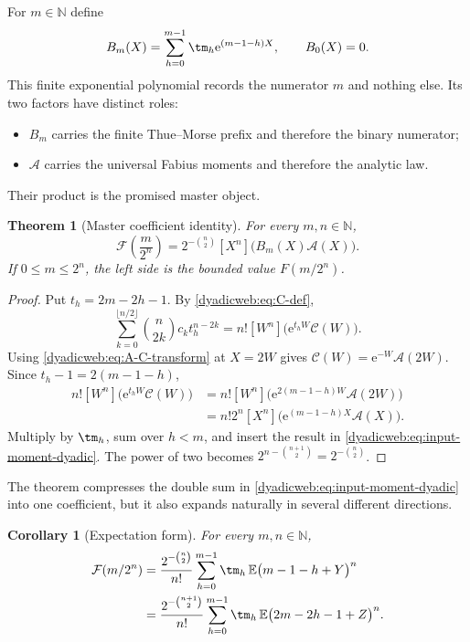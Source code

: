 \documentclass[11pt,oneside]{article}
\newtheorem{theorem}{Theorem}[section]
\newtheorem{corollary}[corollary]{Corollary}
\theoremstyle{definition}
\theoremstyle{remark}
\newcommand{\N}{\mathbb N}
\newcommand{\e}{\mathrm e}
\newcommand{\E}{\mathbb E}
\begin{document}
For $m\in\N$ define
\begin{equation}
 B_m(X)=\sum_{h=0}^{m-1}\tm_h\e^{(m-1-h)X},
 \qquad B_0(X)=0.                                         \label{dyadicweb:eq:Bm-def}
\end{equation}
This finite exponential polynomial records the numerator $m$ and nothing else.  Its two
factors have distinct roles:
\begin{itemize}
\item $B_m$ carries the finite Thue--Morse prefix and therefore the binary numerator;
\item $\mathscr A$ carries the universal Fabius moments and therefore the analytic law.
\end{itemize}
Their product is the promised master object.

\begin{theorem}[Master coefficient identity]
\label{dyadicweb:thm:master-coefficient}
For every $m,n\in\N$,
\begin{equation}
 \boxed{
 \mathcal F\!\left(\frac{m}{2^n}\right)
 =2^{-\binom n2}[X^n]\bigl(B_m(X)\mathscr A(X)\bigr).}    \label{dyadicweb:eq:master-coefficient}
\end{equation}
If $0\le m\le2^n$, the left side is the bounded value $F(m/2^n)$.
\end{theorem}

\begin{proof}
Put $t_h=2m-2h-1$.  By \eqref{dyadicweb:eq:C-def},
\[
 \sum_{k=0}^{\lfloor n/2\rfloor}\binom n{2k}c_kt_h^{n-2k}
 =n![W^n]\bigl(\e^{t_hW}\mathscr C(W)\bigr).
\]
Using \eqref{dyadicweb:eq:A-C-transform} at $X=2W$ gives
$\mathscr C(W)=\e^{-W}\mathscr A(2W)$.  Since $t_h-1=2(m-1-h)$,
\begin{align*}
 n![W^n]\bigl(\e^{t_hW}\mathscr C(W)\bigr)
 &=n![W^n]\bigl(\e^{2(m-1-h)W}\mathscr A(2W)\bigr)\\
 &=n!2^n[X^n]\bigl(\e^{(m-1-h)X}\mathscr A(X)\bigr).
\end{align*}
Multiply by $\tm_h$, sum over $h<m$, and insert the result in
\eqref{dyadicweb:eq:input-moment-dyadic}.  The power of two becomes
$2^{n-\binom{n+1}{2}}=2^{-\binom n2}$.
\end{proof}

The theorem compresses the double sum in \eqref{dyadicweb:eq:input-moment-dyadic} into one coefficient,
but it also expands naturally in several different directions.

\begin{corollary}[Expectation form]
\label{dyadicweb:cor:expectation-dyadic}
For every $m,n\in\N$,
\begin{align}
 \mathcal F(m/2^n)
 &=\frac{2^{-\binom n2}}{n!}
   \sum_{h=0}^{m-1}\tm_h\,
   \E\bigl(m-1-h+Y\bigr)^n                              \label{dyadicweb:eq:expectation-Y}\\
 &=\frac{2^{-\binom{n+1}{2}}}{n!}
   \sum_{h=0}^{m-1}\tm_h\,
   \E\bigl(2m-2h-1+Z\bigr)^n.                            \label{dyadicweb:eq:expectation-Z}
\end{align}
\end{corollary}
\end{document}

